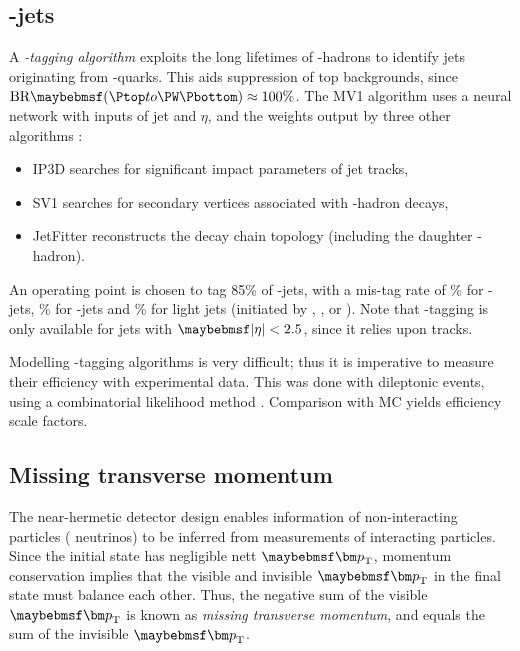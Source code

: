 \subsection{\Pbottom-jets}
\label{sec:objects:bjets}

A \textit{\Pbottom-tagging algorithm} exploits the long lifetimes of \Pbottom-hadrons to 
identify jets originating from \Pbottom-quarks. This aids suppression of top backgrounds, 
since $\text{BR}\parenths{\HepProcess{\Ptop \HepTo \PW\Pbottom}} \approx 100\%$. 
The MV1 algorithm uses a neural network with inputs of jet \pt and $\eta$, and the weights 
output by three other algorithms \cite{Btag:algorithms}:
\begin{itemize}[noitemsep,nolistsep]
	\item IP3D searches for significant impact parameters of jet tracks, \storeliststyle{}
	\item SV1 searches for secondary vertices associated with \Pbottom-hadron decays,
	\item JetFitter reconstructs the decay chain topology (including the daughter 
	\Pcharm-hadron).
\end{itemize}
An operating point is chosen to tag 85\% of \Pbottom-jets, with a mis-tag rate of 
\% for \Pcharm-jets, \% for \Ptau-jets and \% for light jets
(initiated by \Pup, \Pdown, \Pstrange or \Pgluon). Note that \Pbottom-tagging is only 
available for jets with $\mods{\eta} < 2.5$, since it relies upon tracks.

Modelling \Pbottom-tagging algorithms is very difficult; thus it is imperative to measure 
their efficiency with experimental data. This was done with dileptonic \ttbar events, 
using a combinatorial likelihood method \cite{Btag:llh}. Comparison with MC yields 
efficiency scale factors.



\subsection{Missing transverse momentum}
\label{sec:objects:met}

The near-hermetic detector design enables information of non-interacting particles (\eg 
neutrinos) to be inferred from measurements of interacting particles. Since the initial 
state has negligible nett $\bvec{p}_{\text{T}}$, momentum conservation implies that the 
visible and invisible $\bvec{p}_{\text{T}}$ in the final state must balance each other. Thus, 
the negative sum of the visible $\bvec{p}_{\text{T}}$ is known as \textit{missing transverse 
momentum}, and equals the sum of the invisible $\bvec{p}_{\text{T}}$.

